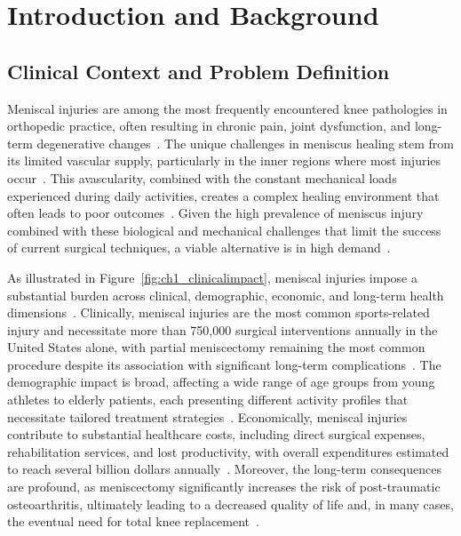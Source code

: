 \chapter{Introduction and Background}\label{chap:intro}

\section{Clinical Context and Problem Definition}

Meniscal injuries are among the most frequently encountered knee pathologies in orthopedic practice, often resulting in chronic pain, joint dysfunction, and long-term degenerative changes~\cite{mordecai2014treatmentmeniscal, beeler2020meniscussizing, baek2015meniscustissue, abdelgaied2015comparisonbiomechanical}.
The unique challenges in meniscus healing stem from its limited vascular supply, particularly in the inner regions where most injuries occur~\cite{athanasiou2009engineeringknee, makris2011kneemeniscus, tran2020comprehensivereview}.
This avascularity, combined with the constant mechanical loads experienced during daily activities, creates a complex healing environment that often leads to poor outcomes~\cite{makris2011kneemeniscus, athanasiou2009engineeringknee, bahcecioglu20193dprinted}.
Given the high prevalence of meniscus injury combined with these biological and mechanical challenges that limit the success of current surgical techniques, a viable alternative is in high demand~\cite{mordecai2014treatmentmeniscal, a.murphy20243dprintedvariable, baek2015meniscustissue}.



As illustrated in Figure~\ref{fig:ch1_clinicalimpact}, meniscal injuries impose a substantial burden across clinical, demographic, economic, and long-term health dimensions~\cite{mordecai2014treatmentmeniscal, beeler2020meniscussizing, baek2015meniscustissue, abdelgaied2015comparisonbiomechanical}.
Clinically, meniscal injuries are the most common sports-related injury and necessitate more than 750,000 surgical interventions annually in the United States alone, with partial meniscectomy remaining the most common procedure despite its association with significant long-term complications~\cite{mordecai2014treatmentmeniscal, beeler2020meniscussizing, baek2015meniscustissue}.
The demographic impact is broad, affecting a wide range of age groups from young athletes to elderly patients, each presenting different activity profiles that necessitate tailored treatment strategies~\cite{mordecai2014treatmentmeniscal, baek2015meniscustissue, abdelgaied2015comparisonbiomechanical}.
Economically, meniscal injuries contribute to substantial healthcare costs, including direct surgical expenses, rehabilitation services, and lost productivity, with overall expenditures estimated to reach several billion dollars annually~\cite{beeler2020meniscussizing, mordecai2014treatmentmeniscal, baek2015meniscustissue}.
Moreover, the long-term consequences are profound, as meniscectomy significantly increases the risk of post-traumatic osteoarthritis, ultimately leading to a decreased quality of life and, in many cases, the eventual need for total knee replacement~\cite{mordecai2014treatmentmeniscal, abdelgaied2015comparisonbiomechanical, baek2015meniscustissue}.

